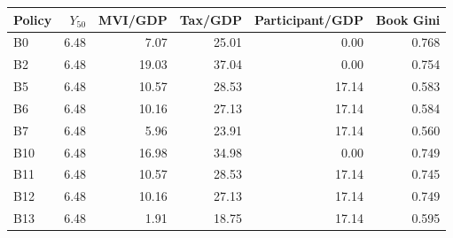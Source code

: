 \begin{tabular}{@{}lrrrrr@{}}
\toprule
Policy & $Y_{50}$ & MVI/GDP & Tax/GDP & Participant/GDP & Book Gini \\
\midrule
B0 & 6.48 & 7.07 & 25.01 & 0.00 & 0.768 \\
B2 & 6.48 & 19.03 & 37.04 & 0.00 & 0.754 \\
B5 & 6.48 & 10.57 & 28.53 & 17.14 & 0.583 \\
B6 & 6.48 & 10.16 & 27.13 & 17.14 & 0.584 \\
B7 & 6.48 & 5.96 & 23.91 & 17.14 & 0.560 \\
B10 & 6.48 & 16.98 & 34.98 & 0.00 & 0.749 \\
B11 & 6.48 & 10.57 & 28.53 & 17.14 & 0.745 \\
B12 & 6.48 & 10.16 & 27.13 & 17.14 & 0.749 \\
B13 & 6.48 & 1.91 & 18.75 & 17.14 & 0.595 \\
\bottomrule
\end{tabular}
